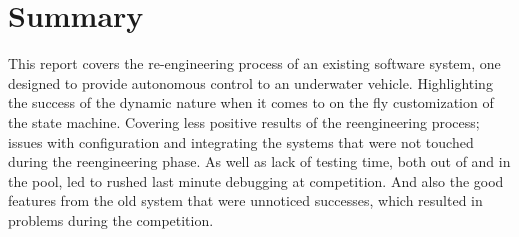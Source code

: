 \documentclass[
12pt, %
oneside, %
english, %
singlespacing, %
parskip, %
headsepline, %
chapterinoneline, %
]{MastersDoctoralThesis} %
\begin{document}

\tableofcontents %

\listoffigures %

\listoftables %

\newpage
\section*{Summary}
This report covers the re-engineering process of an existing software system,
one designed to provide autonomous control to an underwater vehicle.
Highlighting the success of the dynamic nature when it comes to on the fly
customization of the state machine.
Covering less positive results of the reengineering process; issues with
configuration and integrating the systems that were not
touched during the reengineering phase.
As well as lack of testing time, both out of and in the pool, led to rushed
last minute debugging at competition.
And also the good features from the old system that were unnoticed successes,
which resulted in problems during the competition.

\printglossaries %


\mainmatter %

\pagestyle{thesis} %








\end{document}

